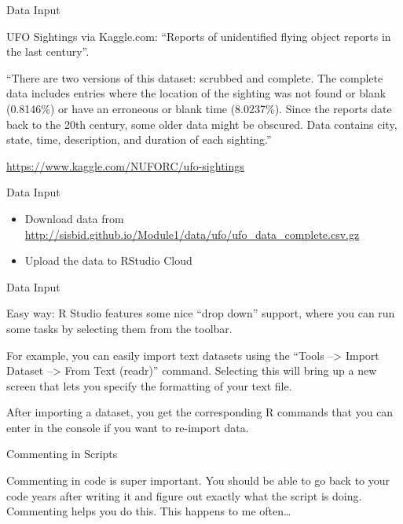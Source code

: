\documentclass[
  ignorenonframetext,
]{beamer}
\providecommand{\tightlist}{%
  \setlength{\itemsep}{0pt}\setlength{\parskip}{0pt}}
\begin{document}
\begin{frame}{Data Input}
\protect\hypertarget{data-input-1}{}

UFO Sightings via Kaggle.com: ``Reports of unidentified flying object
reports in the last century''.

``There are two versions of this dataset: scrubbed and complete. The
complete data includes entries where the location of the sighting was
not found or blank (0.8146\%) or have an erroneous or blank time
(8.0237\%). Since the reports date back to the 20th century, some older
data might be obscured. Data contains city, state, time, description,
and duration of each sighting.''

\url{https://www.kaggle.com/NUFORC/ufo-sightings}

\end{frame}

\begin{frame}{Data Input}
\protect\hypertarget{data-input-2}{}

\begin{itemize}
\tightlist
\item
  Download data from
  \url{http://sisbid.github.io/Module1/data/ufo/ufo_data_complete.csv.gz}
\item
  Upload the data to RStudio Cloud
\end{itemize}

\end{frame}

\begin{frame}{Data Input}
\protect\hypertarget{data-input-3}{}

Easy way: R Studio features some nice ``drop down'' support, where you
can run some tasks by selecting them from the toolbar.

For example, you can easily import text datasets using the ``Tools
--\textgreater{} Import Dataset --\textgreater{} From Text (readr)''
command. Selecting this will bring up a new screen that lets you specify
the formatting of your text file.

After importing a dataset, you get the corresponding R commands that you
can enter in the console if you want to re-import data.

\end{frame}

\begin{frame}{Commenting in Scripts}
\protect\hypertarget{commenting-in-scripts}{}

Commenting in code is super important. You should be able to go back to
your code years after writing it and figure out exactly what the script
is doing. Commenting helps you do this. This happens to me often\ldots{}

\end{frame}
\end{document}

